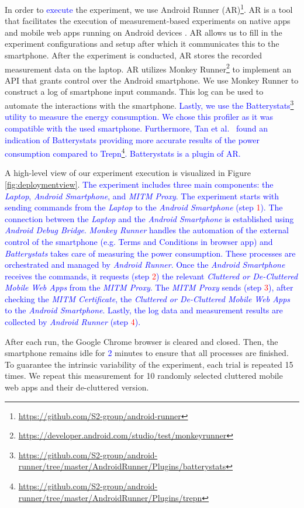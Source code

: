In order to \textcolor{blue}{execute} the experiment, we use Android Runner (AR)\footnote{\url{https://github.com/S2-group/android-runner}}. AR is a tool that facilitates the execution of measurement-based experiments on native apps and mobile web apps running on Android devices \cite{malavolta2020runner}. AR allows us to fill in the experiment configurations and setup after which it communicates this to the smartphone. After the experiment is conducted, AR stores the recorded measurement data on the laptop. AR utilizes Monkey Runner\footnote{\url{https://developer.android.com/studio/test/monkeyrunner}} to implement an API that grants control over the Android smartphone. We use Monkey Runner to construct a log of smartphone input commands. This log can be used to automate the interactions with the smartphone. \textcolor{blue}{Lastly, we use the Batterystats\footnote{\url{https://github.com/S2-group/android-runner/tree/master/AndroidRunner/Plugins/batterystats}} utility to measure the energy consumption. We chose this profiler as it was compatible with the used smartphone. Furthermore, Tan et al.~\cite{integrationtan} found an indication of Batterystats providing more accurate results of the power consumption compared to Trepn\footnote{\url{https://github.com/S2-group/android-runner/tree/master/AndroidRunner/Plugins/trepn}}. Batterystats is a plugin of AR.}

A high-level view of our experiment execution is visualized in Figure \ref{fig:deploymentview}. \textcolor{blue}{The experiment includes three main components: the \textit{Laptop}, \textit{Android Smartphone}, and \textit{MITM Proxy}. The experiment starts with sending commands from the \textit{Laptop} to the \textit{Android Smartphone} (step \textcolor{red}{1}). The connection between the \textit{Laptop} and the \textit{Android Smartphone} is established using \textit{Android Debug Bridge}. \textit{Monkey Runner} handles the automation of the external control of the smartphone (e.g. Terms and Conditions in browser app) and \textit{Batterystats} takes care of measuring the power consumption. These processes are orchestrated and managed by \textit{Android Runner}. Once the \textit{Android Smartphone} receives the commands, it requests (step \textcolor{red}{2}) the relevant \textit{Cluttered or De-Cluttered Mobile Web Apps} from the \textit{MITM Proxy}. The \textit{MITM Proxy} sends (step \textcolor{red}{3}), after checking the \textit{MITM Certificate}, the \textit{Cluttered or De-Cluttered Mobile Web Apps} to the \textit{Android Smartphone}. Lastly, the log data and measurement results are collected by \textit{Android Runner} (step \textcolor{red}{4}).}

After each run, the Google Chrome browser is cleared and closed. Then, the smartphone remains idle for \textcolor{blue}{2} minutes to ensure that all processes are finished. To guarantee the intrinsic variability of the experiment, each trial is repeated 15 times. We repeat this measurement for 10 randomly selected cluttered mobile web apps and their de-cluttered version.